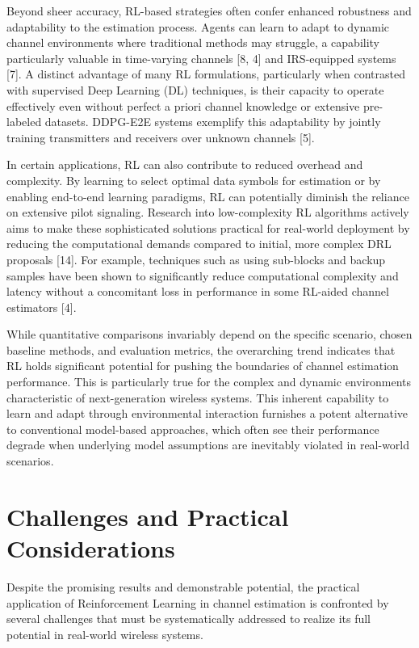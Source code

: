 \documentclass[journal,twocolumn]{IEEEtran}
\begin{document}
Beyond sheer accuracy, RL-based strategies often confer enhanced robustness and adaptability to the estimation process. Agents can learn to adapt to dynamic channel environments where traditional methods may struggle, a capability particularly valuable in time-varying channels [8, 4] and IRS-equipped systems [7]. A distinct advantage of many RL formulations, particularly when contrasted with supervised Deep Learning (DL) techniques, is their capacity to operate effectively even without perfect a priori channel knowledge or extensive pre-labeled datasets. DDPG-E2E systems exemplify this adaptability by jointly training transmitters and receivers over unknown channels [5].

In certain applications, RL can also contribute to reduced overhead and complexity. By learning to select optimal data symbols for estimation or by enabling end-to-end learning paradigms, RL can potentially diminish the reliance on extensive pilot signaling. Research into low-complexity RL algorithms actively aims to make these sophisticated solutions practical for real-world deployment by reducing the computational demands compared to initial, more complex DRL proposals [14]. For example, techniques such as using sub-blocks and backup samples have been shown to significantly reduce computational complexity and latency without a concomitant loss in performance in some RL-aided channel estimators [4].

While quantitative comparisons invariably depend on the specific scenario, chosen baseline methods, and evaluation metrics, the overarching trend indicates that RL holds significant potential for pushing the boundaries of channel estimation performance. This is particularly true for the complex and dynamic environments characteristic of next-generation wireless systems. This inherent capability to learn and adapt through environmental interaction furnishes a potent alternative to conventional model-based approaches, which often see their performance degrade when underlying model assumptions are inevitably violated in real-world scenarios.

\section{Challenges and Practical Considerations}

Despite the promising results and demonstrable potential, the practical application of Reinforcement Learning in channel estimation is confronted by several challenges that must be systematically addressed to realize its full potential in real-world wireless systems.
\end{document}
